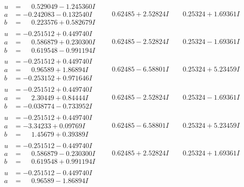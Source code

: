 \documentclass[1p]{elsarticle_modified}
\theoremstyle{definition}
\begin{document}
$$\begin{array}{c|c|c}
\begin{aligned}
u &= \phantom{-}0.529049 - 1.245360 I \\
a &= -0.242083 - 0.132540 I \\
b &= \phantom{-}0.223576 + 0.582679 I\end{aligned}
 & \phantom{-}0.62485 + 2.52824 I & \phantom{-}0.25324 + 1.69361 I \\ \hline\begin{aligned}
u &= -0.251512 + 0.449740 I \\
a &= \phantom{-}0.586879 + 0.230300 I \\
b &= \phantom{-}0.619548 - 0.991194 I\end{aligned}
 & \phantom{-}0.62485 - 2.52824 I & \phantom{-}0.25324 - 1.69361 I \\ \hline\begin{aligned}
u &= -0.251512 + 0.449740 I \\
a &= \phantom{-}0.96589 + 1.86894 I \\
b &= -0.253152 + 0.971646 I\end{aligned}
 & \phantom{-}0.62485 - 6.58801 I & \phantom{-}0.25324 + 5.23459 I \\ \hline\begin{aligned}
u &= -0.251512 + 0.449740 I \\
a &= \phantom{-}2.30449 + 0.84444 I \\
b &= -0.038774 - 0.733952 I\end{aligned}
 & \phantom{-}0.62485 - 2.52824 I & \phantom{-}0.25324 - 1.69361 I \\ \hline\begin{aligned}
u &= -0.251512 + 0.449740 I \\
a &= -3.34233 + 0.09769 I \\
b &= \phantom{-}1.45679 + 0.39389 I\end{aligned}
 & \phantom{-}0.62485 - 6.58801 I & \phantom{-}0.25324 + 5.23459 I \\ \hline\begin{aligned}
u &= -0.251512 - 0.449740 I \\
a &= \phantom{-}0.586879 - 0.230300 I \\
b &= \phantom{-}0.619548 + 0.991194 I\end{aligned}
 & \phantom{-}0.62485 + 2.52824 I & \phantom{-}0.25324 + 1.69361 I \\ \hline\begin{aligned}
u &= -0.251512 - 0.449740 I \\
a &= \phantom{-}0.96589 - 1.86894 I \\

\end{aligned}
\end{array}$$
\end{document}
